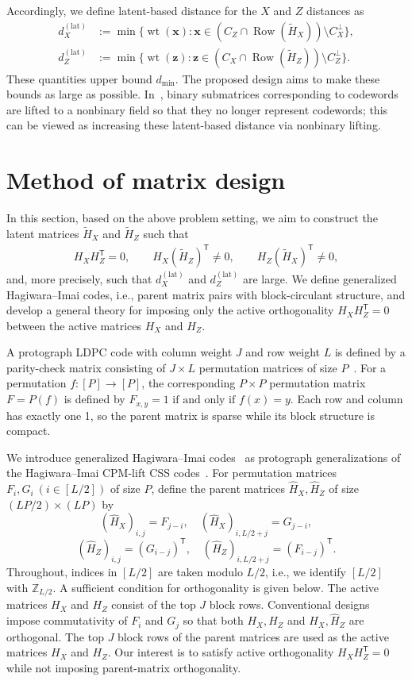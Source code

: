 \documentclass[a4paper,onecolumn,11pt,accepted=2026-08-03]{quantumarticle}
\newcommand{\idxLtwo}{[L/2]}
\newcommand{\Hful}{\hat{H}}
\newcommand{\Hres}{\tilde{H}}
\DeclareMathOperator{\Row}{Row}
\DeclareMathOperator{\wt}{wt}
\renewcommand\[{\begin{equation}}
\renewcommand\]{\end{equation}}
\theoremstyle{definition}
\begin{document}
Accordingly, we define latent-based distance for the $X$ and $Z$ distances as
\begin{align}
 d_X^{(\mathrm{lat})} &:= \min\{\wt(\boldsymbol{x}) : \boldsymbol{x}\in (C_Z\cap\Row(\Hres_X))\setminus C_X^{\perp}\},\\
d_Z^{(\mathrm{lat})} &:= \min\{\wt(\boldsymbol{z}) : \boldsymbol{z}\in (C_X\cap\Row(\Hres_Z))\setminus C_Z^{\perp}\}. 
\end{align}
These quantities upper bound $d_{\min}$.
The proposed design aims to make these bounds as large as possible. In~\cite{Kasai2025Hashing}, binary submatrices corresponding to codewords are lifted to a nonbinary field so that they no longer represent codewords; this can be viewed as increasing these latent-based distance via nonbinary lifting.

\section{Method of matrix design}
\label{sec:general-theory}
In this section, based on the above problem setting, we aim to construct the latent matrices $\Hres_X$ and $\Hres_Z$ such that
\begin{align}
 H_XH_Z^{\mathsf T}=0, \qquad H_X(\Hres_Z)^{\mathsf T}\neq 0,\qquad H_Z(\Hres_X)^{\mathsf T}\neq 0,
\end{align}
and, more precisely, such that $d_X^{(\mathrm{lat})}$ and $d_Z^{(\mathrm{lat})}$ are large.
We define generalized Hagiwara--Imai codes, i.e., parent matrix pairs with block-circulant structure, and develop a general theory for imposing only the active orthogonality $H_XH_Z^{\mathsf T}=0$ between the active matrices $H_X$ and $H_Z$.

A protograph LDPC code with column weight $J$ and row weight $L$ is defined by a parity-check matrix consisting of $J\times L$ permutation matrices of size $P$~\cite{Thorpe2003}. For a permutation $f:[P]\to[P]$, the corresponding $P\times P$ permutation matrix $F=P(f)$ is defined by
\(
F_{x,y}=1 \text{ if and only if } f(x)=y.
\)
Each row and column has exactly one 1, so the parent matrix is sparse while its block structure is compact.

We introduce generalized Hagiwara--Imai codes~\cite{KomotoKasai2025} as protograph generalizations of the Hagiwara--Imai   CPM-lift  CSS codes~\cite{HagiwaraImai2007}. For permutation matrices $F_i,G_i\ (i\in[L/2])$ of size $P$, define the parent matrices $\Hful_X,\Hful_Z$ of size $(LP/2)\times(LP)$ by
\[
(\Hful_X)_{i,j}=F_{j-i},\quad
(\Hful_X)_{i,L/2+j}=G_{j-i},
\]
\[
(\Hful_Z)_{i,j}=(G_{i-j})^{\mathsf T},\quad
(\Hful_Z)_{i,L/2+j}=(F_{i-j})^{\mathsf T}.
\]
 Throughout, indices in $\idxLtwo$ are taken modulo $L/2$, i.e., we identify $\idxLtwo$ with $\mathbb{Z}_{L/2}$. A sufficient condition for orthogonality is given below. The active matrices $H_X$ and $H_Z$ consist of the top $J$ block rows. Conventional designs \cite{KomotoKasai2025, Kasai2025Hashing} impose commutativity of $F_i$ and $G_j$ so that both $H_X,H_Z$ and $\Hful_X,\Hful_Z$ are orthogonal.
The top $J$ block rows of the parent matrices are used as the active matrices $H_X$ and $H_Z$. Our interest is to satisfy active orthogonality $H_XH_Z^{\mathsf T}=0$ while not imposing parent-matrix orthogonality.
\end{document}
